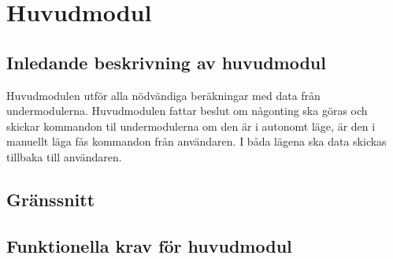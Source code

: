 \section{Huvudmodul}

\subsection{Inledande beskrivning av huvudmodul}
Huvudmodulen utför alla nödvändiga beräkningar med data från undermodulerna. Huvudmodulen fattar beslut om någonting ska göras och skickar kommandon til undermodulerna om den är i autonomt läge, är den i manuellt läga fås kommandon från användaren. I båda lägena ska data skickas tillbaka till användaren.

\subsection{Gränssnitt}
\begin{LIPSkravlista}
\end{LIPSkravlista}

\subsection{Funktionella krav för huvudmodul}	
\begin{LIPSkravlista}
\end{LIPSkravlista}
